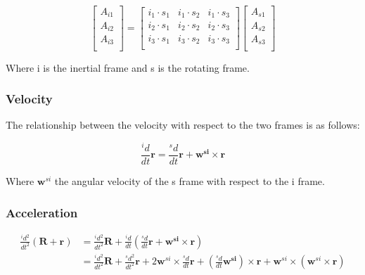 \documentclass{article}
\theoremstyle{definition}
\begin{document}
\begin{equation}\label{rot_mat}
 \begin{bmatrix} 
 A_{i1}\\
 A_{i2}\\
 A_{i3}\\
 \end{bmatrix} 
 =
 \begin{bmatrix}
 i_1\cdot s_1 & i_1\cdot s_2 & i_1\cdot s_3\\
 i_2\cdot s_1 & i_2\cdot s_2 & i_2\cdot s_3\\
 i_3\cdot s_1 & i_3\cdot s_2 & i_3\cdot s_3\\
 \end{bmatrix}
 \begin{bmatrix}
 A_{s1}\\
 A_{s2}\\
 A_{s3}\\
 \end{bmatrix}
\end{equation}

Where i is the inertial frame and s is the rotating frame.

\subsubsection{Velocity}
The relationship between the velocity with respect to the two frames is as follows:

\begin{equation}\label{vel_frame}
 \frac{^{i}d}{dt}\boldsymbol{r}=\frac{^{s}d}{dt}\boldsymbol r + \boldsymbol{w^{si}\times r}
\end{equation}

Where $\boldsymbol w^{si}$ the angular velocity of the s frame with respect to the i frame.

\subsubsection{Acceleration}

\begin{equation}\label{acc}
\begin{split}
  \frac{^{i}d^2}{dt^2}(\boldsymbol{R}+\boldsymbol{r}) & = \frac{^{i}d^2}{dt^2}\boldsymbol{R} + \frac{^{i}d}{dt}\left(\frac{^{s}d}{dt}\boldsymbol{r} + \boldsymbol{w^{si}\times r}\right)\\
  & = \frac{^{i}d^2}{dt^2}\boldsymbol{R} + \frac{^{s}d^2}{dt^2}\boldsymbol{r} + 
  2\boldsymbol w^{si}\times \frac{^{s}d}{dt}\boldsymbol{r} + \left(\frac{^{s}d}{dt}\boldsymbol{w^{si}}\right)\times \boldsymbol{r} + \boldsymbol w^{si} \times ( \boldsymbol w^{si} \times \boldsymbol{r})
\end{split}
\end{equation}
\end{document}
